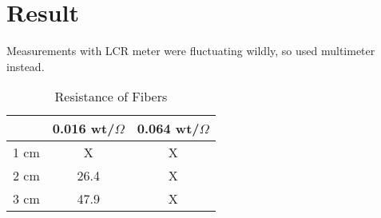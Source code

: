 \documentclass{article}
\begin{document}
\pagebreak

\section{Result}
Measurements with LCR meter were fluctuating wildly, so used multimeter instead. 
\begin{table}[h!]
\centering
\begin{tabular}{ |c|c|c| } 
 \hline
  & 0.016 wt/$\Omega$ & 0.064 wt/$\Omega$\\
 \hline
 1 cm & X & X \\ 
 2 cm & 26.4 & X \\ 
 3 cm & 47.9 & X \\ 
 \hline
\end{tabular}
 \caption{Resistance of Fibers}
\label{table:1}
\end{table}
\end{document}
